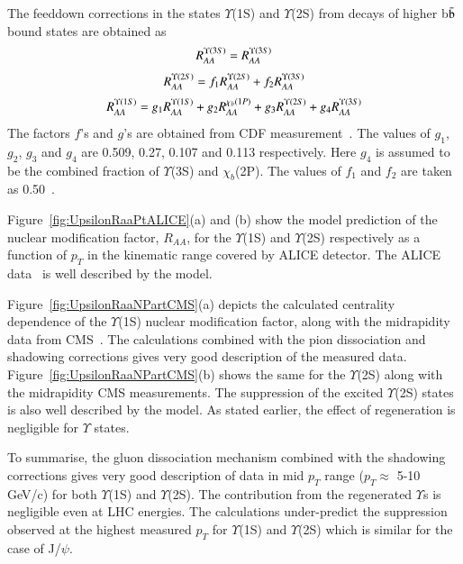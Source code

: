 {The feeddown corrections in the states $\Upsilon$(1S) and $\Upsilon$(2S) 
from decays of higher b$\bar{\rm b}$ bound states are obtained as
  \begin{equation}
    R_{AA}^{\Upsilon(3S)} = R_{AA}^{\Upsilon(3S)}\\ %
  \end{equation}
  \begin{equation}
    R_{AA}^{\Upsilon(2S)} = f_1 R_{AA}^{\Upsilon(2S)} +  f_2 R_{AA}^{\Upsilon(3S)} \\ %
  \end{equation}
   \begin{equation}
    R_{AA}^{\Upsilon(1S)} = g_1 R_{AA}^{\Upsilon(1S)} +  g_2 R_{AA}^{\chi_b(1P)} + g_3 R_{AA}^{\Upsilon(2S)} + g_4 R_{AA}^{\Upsilon(3S)}\\ %
  \end{equation}
The factors $f$'s and $g$'s are obtained from CDF measurement~\cite{Affolder:1999wm}.
The values of $g_1$, $g_2$, $g_3$ and $g_4$ are 0.509, 0.27, 0.107
and 0.113 respectively. Here $g_4$ is assumed to be the combined fraction of 
$\Upsilon$(3S) and $\chi_b$(2P).
The values of $f_1$ and $f_2$ are taken as 0.50~\cite{Strickland:2011aa}.


Figure~\ref{fig:UpsilonRaaPtALICE}(a) and (b) show the model 
prediction \cite{Kumar:2019xdj} of the nuclear modification factor, $R_{AA}$, for the $\Upsilon$(1S)
and $\Upsilon$(2S) respectively as a function of $p_T$ in the kinematic range
covered by ALICE detector. The ALICE data~\cite{ALICE:2020wwx} is well described by the model.

Figure~\ref{fig:UpsilonRaaNPartCMS}(a) depicts the calculated \cite{Kumar:2019xdj}
centrality dependence of the $\Upsilon$(1S) nuclear
modification factor, along with the midrapidity data from CMS~\cite{CMS:2018zza}.
The calculations combined with the pion dissociation and shadowing corrections 
gives very good description of the measured data. Figure~\ref{fig:UpsilonRaaNPartCMS}(b)
shows the same for the $\Upsilon$(2S) along with the midrapidity
CMS measurements. The suppression of the excited $\Upsilon$(2S) states 
is also well described by the model. As stated earlier, the effect of regeneration is
negligible for $\Upsilon$ states. 

To summarise, the gluon dissociation mechanism combined with the shadowing
corrections gives very good description of data in mid $p_{T}$ range ($p_{T}\approx$ 5-10 GeV/c)
for both $\Upsilon$(1S) and $\Upsilon$(2S).
The contribution from the regenerated $\Upsilon$s is negligible even at LHC energies.
The calculations under-predict the suppression observed at the highest measured
$p_{T}$ for $\Upsilon$(1S) and $\Upsilon$(2S) which is similar for the case
of J/$\psi$.


}
